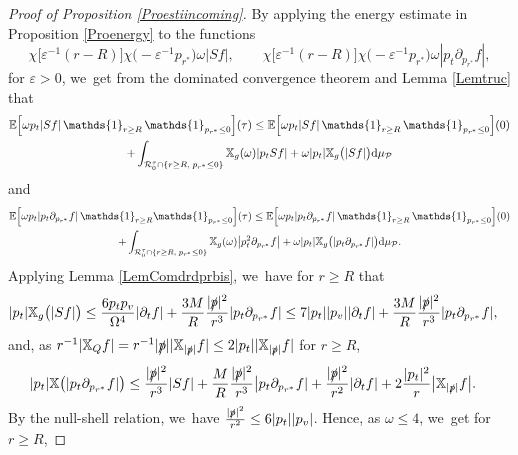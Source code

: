 \documentclass[JEP,XML,SOM,Unicode,published]{cedram}
\let\epsilon\varepsilon
\theoremstyle{plain}
\theoremstyle{definition}
\newcommand\T{{\mathbb{X}}}
\newcommand\dr{{\mathrm{d}}}
\begin{document}
\begin{proof}[Proof of Proposition \ref{Proestiincoming}]
By applying the energy estimate in Proposition \ref{Proenergy} to the functions
\[
\chi \bigl[ \epsilon^{-1}(r-R) \bigr] \chi \bigl(- \epsilon^{-1} p_{r^*} \bigr) \omega |Sf|,\qquad \chi \bigl[ \epsilon^{-1}(r-R) \bigr] \chi \bigl(- \epsilon^{-1} p_{r^*} \bigr)\omega|p_t \partial_{p_{r^*}} f|,
\]
for $\epsilon >0$, we~get from the dominated convergence theorem and Lemma \ref{Lemtruc} that
\begin{multline*}
\mathbb{E} \Bigl[ \omega p_t |Sf| \, \mathds{1}_{r \geq R} \, \mathds{1}_{p_{r^*} \leq 0} \Bigr](\tau)
\leq \mathbb{E} \Bigl[ \omega p_t |Sf| \, \mathds{1}_{r \geq R} \, \mathds{1}_{p_{r^*} \leq 0} \Bigr](0) \\
+\int_{\mathcal{R}_0^\tau \cap \{r \geq R, \; p_{r^*} \leq 0 \}} \T_g(\omega) |p_t Sf| +\omega|p_t| \T_g\bigl(|Sf| \bigr) \dr \mu_{\mathcal{P}}
\end{multline*}
and
\begin{multline*}
\mathbb{E} \Bigl[ \omega p_t |p_t \partial_{p_{r^*}} f| \, \mathds{1}_{r \geq R} \mathds{1}_{p_{r^*} \leq 0} \Bigr](\tau) \leq \mathbb{E} \Bigl[ \omega p_t |p_t \partial_{p_{r^*}} f|\, \mathds{1}_{r \geq R} \, \mathds{1}_{p_{r^*} \leq 0} \Bigr](0)\\
+\int_{\mathcal{R}_0^\tau \cap \{r \geq R, \; p_{r^*} \leq 0 \}} \T_g(\omega) \big|p_t^2 \partial_{p_{r^*}}f \big| +\omega|p_t| \T_g\bigl(|p_t \partial_{p_{r^*}}f| \bigr) \dr \mu_{\mathcal{P}}.
\end{multline*}
Applying Lemma \ref{LemComdrdprbis}, we~have for $r \geq R$ that
\begin{align*}
|p_t| \T_g \bigl(|S f | \bigr) & \leq \frac{6p_tp_v}{ \Omega^4}|\partial_t f| +\frac{3M}{R} \frac{ |\slashed{p}|^2}{r^3} |p_t \partial_{p_{r^*}} f | \leq 7 |p_t||p_v||\partial_t f| +\frac{3M}{R} \frac{ |\slashed{p}|^2}{r^3} |p_t \partial_{p_{r^*}} f |,
\end{align*}
and, as $r^{-1} |\T_Q f| = r^{-1} |\slashed{p}| |\T_{|\slashed{p}|} f| \leq 2 |p_t||\T_{|\slashed{p}|} f|$ for $r \geq R$,
\begin{align*}
|p_t|\T \bigl(|p_t \partial_{p_{r^*}} f | \bigr) & \leq \frac{|\slashed{p}|^2}{r^3 } |Sf|+\frac{M}{R}\frac{|\slashed{p}|^2}{r^3}\big|p_{t} \partial_{p_{r^*}}f |+\frac{|\slashed{p}|^2}{r^2 } | \partial_t f|+2\frac{|p_{t}|^2}{r } \big|\T_{|\slashed{p}|} f \big|.
\end{align*}
By the null-shell relation, we~have $\frac{|\slashed{p}|^2}{r^2} \leq 6 |p_t||p_v|$. Hence, as $\omega \leq 4$, we~get for $r \geq R$,

\end{proof}
\end{document}
